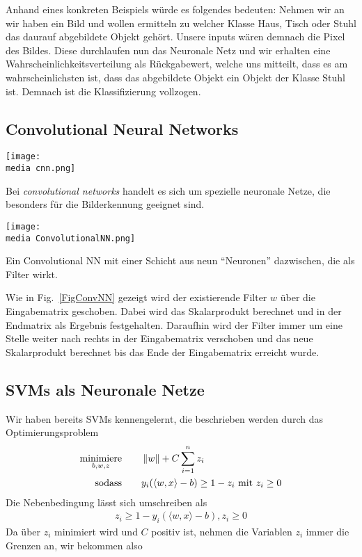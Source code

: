 Anhand eines konkreten Beispiels würde es folgendes bedeuten:
Nehmen wir an wir haben ein Bild und wollen ermitteln zu welcher Klasse Haus, Tisch oder Stuhl das daurauf abgebildete Objekt gehört. Unsere inputs wären demnach die Pixel des Bildes. Diese durchlaufen nun das Neuronale Netz und wir erhalten eine Wahrscheinlichkeitsverteilung als Rückgabewert, welche uns mitteilt, dass es am wahrscheinlichsten ist, dass das abgebildete Objekt ein Objekt der Klasse Stuhl ist. Demnach ist die Klassifizierung vollzogen.

\subsection{Convolutional Neural Networks}
\label{ml:cnn}
\begin{dsafigure}
  \centering
		\texttt{[image: \\media cnn.png]}
		\caption{Ein Convolutional Neural Network (CNN) (deutsch \enquote{faltendes neurales Netzwerk}) %
		}
		\label{FigConvNN}
\end{dsafigure}
\noindent Bei \emph{convolutional networks} handelt es sich um spezielle neuronale Netze, die besonders für die Bilderkennung geeignet sind.

\begin{dsafigure}
  \centering
		\texttt{[image: \\media ConvolutionalNN.png]}
		\caption{Ein Convolutional NN mit einer Schicht aus neun \enquote{Neuronen} dazwischen, die als Filter wirkt. }
		\label{FigConvNN}
\end{dsafigure}

Wie in Fig.~\ref{FigConvNN} gezeigt wird der existierende Filter $w$ über die Eingabematrix geschoben. Dabei wird das Skalarprodukt berechnet und in der Endmatrix als Ergebnis festgehalten. Daraufhin wird der Filter immer um eine Stelle weiter nach rechts in der Eingabematrix verschoben und das neue Skalarprodukt berechnet bis das Ende der Eingabematrix erreicht wurde.

\subsection{SVMs als Neuronale Netze}

Wir haben bereits SVMs kennengelernt, die beschrieben werden durch das Optimierungsproblem
\begin{align*}
\underset{b,w,z}{\text{minimiere}} &\qquad\left\lVert w\right\rVert + C  \sum_{i=1}^{n} z_i\\
\text{sodass} &\qquad y_i (\langle w,x \rangle - b) \geq 1 - z_i \text { mit } z_i \geq 0
\end{align*}
Die Nebenbedingung lässt sich umschreiben als
\begin{align*}
z_i \geq 1- y_i (\langle w,x \rangle - b), z_i \geq 0
\end{align*}
Da über $z_i$ minimiert wird und $C$ positiv ist, nehmen die Variablen $z_i$ immer die Grenzen an, wir bekommen also


